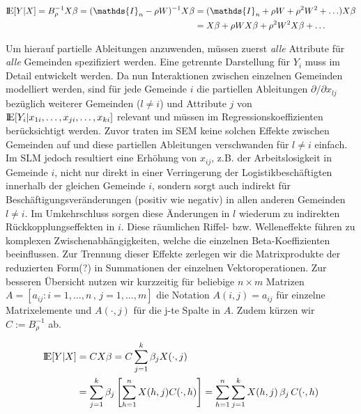 \begin{alignat*}{1}
    \bbbe[Y|X]=B_{\rho}^{-1} X \beta = (\mathds{I}_{n} - \rho W)^{-1} X \beta & = 
    (\mathds{I}_{n} + \rho W + \rho^{2} W^{2} + \ldots) X \beta \\ & =
    X \beta + \rho W X \beta + \rho^{2} W^{2} X \beta + \ldots
\end{alignat*}

Um hierauf partielle Ableitungen anzuwenden, müssen zuerst \emph{alle} Attribute für \emph{alle} Gemeinden 
spezifiziert werden. Eine getrennte Darstellung für $Y_{i}$ muss im Detail entwickelt werden.
Da nun Interaktionen zwischen einzelnen Gemeinden modelliert werden, sind für jede Gemeinde $i$ 
die partiellen Ableitungen ${\partial} \big/ {\partial x_{lj}}$ bezüglich weiterer Gemeinden ($l \neq i$) und Attribute $j$ 
von ${\rm I\!E} [Y_{i}|x_{1i},\ldots,x_{ji},\ldots,x_{ki}] $ relevant und müssen im Regressionskoeffizienten berücksichtigt werden. 
Zuvor traten im SEM keine solchen Effekte zwischen Gemeinden auf und diese partiellen Ableitungen verschwanden für $l \neq i$ einfach.
Im SLM jedoch resultiert eine Erhöhung von $x_{ij}$, z.B. der Arbeitslosigkeit in Gemeinde $i$, nicht nur direkt in einer Verringerung 
der Logistikbeschäftigten innerhalb der gleichen Gemeinde $i$, sondern sorgt auch indirekt für Beschäftigungsveränderungen (positiv wie negativ) 
in allen anderen Gemeinden $l \neq i$. Im Umkehrschluss sorgen diese Änderungen in $l$ wiederum zu indirekten Rückkopplungseffekten in $i$. 
Diese räumlichen Riffel- bzw. Welleneffekte führen zu komplexen Zwischenabhängigkeiten, welche die einzelnen Beta-Koeffizienten beeinflussen.
Zur Trennung dieser Effekte zerlegen wir die Matrixprodukte der reduzierten Form(?) in Summationen der einzelnen Vektoroperationen. 
Zur besseren Übersicht nutzen wir kurzzeitig für beliebige $n \times m$ Matrizen 
$A=[a_{ij}:i=1,\ldots,n \, , \, j=1,\ldots,m]$ die Notation $A(i,j)=a_{ij}$ für einzelne Matrixelemente 
und $A(\cdot,j)$ für die j-te Spalte in $A$. Zudem kürzen wir $C := B_{\rho}^{-1}$ ab.

\begin{alignat*}{1}
    {\rm I\!E}[Y|X] & = C X \beta = C \sum_{j=1}^{k} \beta_{j} X(\cdot,j) \\
    & = \sum_{j=1}^{k} \beta_{j} \left[ \sum_{h=1}^{n} X(h,j) C(\cdot,h) \right] 
    = \sum_{h=1}^{n} \sum_{j=1}^{k}  X(h,j) \, \beta_{j} \, C(\cdot,h)
\end{alignat*}


